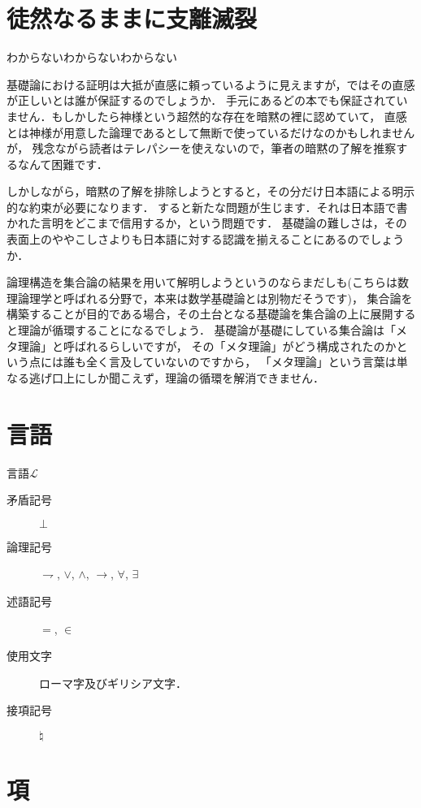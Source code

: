 \documentclass[a4j,10.5pt,oneside,openany]{jsbook}
\theoremstyle{mystyle}
\begin{document}

\section{徒然なるままに支離滅裂}
わからないわからないわからない

基礎論における証明は大抵が直感に頼っているように見えますが，ではその直感が正しいとは誰が保証するのでしょうか．
手元にあるどの本でも保証されていません．もしかしたら神様という超然的な存在を暗黙の裡に認めていて，
直感とは神様が用意した論理であるとして無断で使っているだけなのかもしれませんが，
残念ながら読者はテレパシーを使えないので，筆者の暗黙の了解を推察するなんて困難です．

しかしながら，暗黙の了解を排除しようとすると，その分だけ日本語による明示的な約束が必要になります．
すると新たな問題が生じます．それは日本語で書かれた言明をどこまで信用するか，という問題です．
基礎論の難しさは，その表面上のややこしさよりも日本語に対する認識を揃えることにあるのでしょうか．

論理構造を集合論の結果を用いて解明しようというのならまだしも(こちらは数理論理学と呼ばれる分野で，本来は数学基礎論とは別物だそうです)，
集合論を構築することが目的である場合，その土台となる基礎論を集合論の上に展開すると理論が循環することになるでしょう．
基礎論が基礎にしている集合論は「メタ理論」と呼ばれるらしいですが，
その「メタ理論」がどう構成されたのかという点には誰も全く言及していないのですから，
「メタ理論」という言葉は単なる逃げ口上にしか聞こえず，理論の循環を解消できません．

\section{言語}
	言語$\mathcal{L}$
	\begin{description}
		\item[矛盾記号] $\bot$
		\item[論理記号]  $\rightharpoondown$, $\vee$, $\wedge$, $\rightarrow$,
			$\forall$, $\exists$
		\item[述語記号] $=$, $\in$
		\item[使用文字] ローマ字及びギリシア文字．
		\item[接項記号] $\natural$
	\end{description}

\section{項}
	
\end{document}
